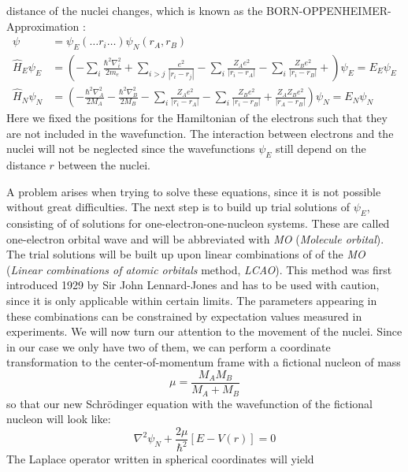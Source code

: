distance of the nuclei changes, which is known as the
\textsc{BORN-OPPENHEIMER}-Approximation \cite{staatsexamen}:
\begin{align}
    \psi &= \psi_E ( \ldots r_i \ldots) \psi_N(r_A, r_B) \\
    \hat{ H}_E\psi_E &= \left(- \sum_{i}{\frac{\hbar^2\nabla_i^2}{2m_e}}
    + \sum_{i>j}{\frac{e^2}{|r_i - r_j|}}
    - \sum_{i}\frac{Z_A e^2}{|r_i - r_A|}
    - \sum_{i}\frac{Z_B e^2}{|r_i - r_B|}
    + 
    \right ) \psi_E = 
 E_E \psi_E \\
 \hat{H}_N\psi_N &= \left (
 -\frac{\hbar^2\nabla_A^2}{2M_A} -\frac{\hbar^2\nabla_B^2}{2M_B}
    - \sum_{i}\frac{Z_A e^2}{|r_i - r_A|}
    - \sum_{i}\frac{Z_B e^2}{|r_i - r_B|}
 + \frac{Z_A Z_B e^2}{|r_A - r_B|}
 \right ) \psi_N
=  E_N \psi_N 
\end{align}
Here we fixed the positions for the Hamiltonian
of the electrons such that they are not included in the
wavefunction. The interaction between electrons and the nuclei
will not be neglected since the wavefunctions $\psi_E$ still depend 
on the distance $r$ between the nuclei. 
\par
A problem arises when trying to solve these equations,
since it is not possible without great difficulties. 
The next step is to build up trial solutions of $\psi_E$, 
consisting of of solutions for one-electron-one-nucleon systems. 
These are called one-electron orbital wave
and will be abbreviated
with \textit{MO} (\textit{Molecule orbital}). The trial solutions
will be built up upon linear combinations of of the \textit{MO}
(\textit{Linear combinations of atomic orbitals} method,
\textit{LCAO}). This method was first introduced 1929 by 
Sir John Lennard-Jones and has to be used with caution, since
it is only applicable within certain limits. The parameters appearing 
in these combinations can be constrained by 
expectation values measured in experiments.
We will now turn our attention to the movement of the nuclei.
Since in our case we only have two of them, we can perform 
a coordinate transformation to the center-of-momentum frame with 
a fictional nucleon of mass
\begin{equation}
    \mu = \frac{M_A M_B}{M_A + M_B}
\end{equation}
so that our new Schrödinger equation with the wavefunction of the
fictional nucleon will look like:
\begin{equation}
    \nabla^2 \psi_N + \frac{2\mu}{\hbar^2} 
    \left[ E - V(r) \right] = 0 
\end{equation}
The Laplace operator written in spherical coordinates will yield
